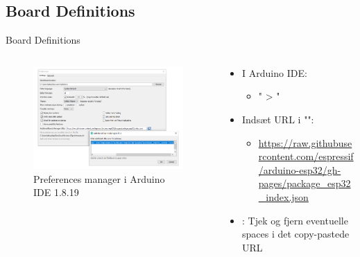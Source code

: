 \documentclass[aspectratio=169]{beamer}
\begin{document}
\subsection{Board Definitions}
\begin{frame}{Board Definitions}
\begin{columns}
	\begin{column}{0.5\textwidth}
		\begin{figure}
  			\includegraphics[width=\textwidth]{assets/pictures/boardsmanager.png}
  			\caption{Preferences manager i Arduino IDE 1.8.19}
  			\label{fig:boardsmanager}
		\end{figure}
	\end{column}
	\begin{column}{0.5\textwidth}
		\begin{textBox}
			\begin{itemize}
				\item I Arduino IDE:
				\begin{itemize}
					 \item " > "
				\end{itemize}
				\item Indsæt URL i "":
				\begin{itemize}
					 \item \tiny\url{https://raw.githubusercontent.com/espressif/arduino-esp32/gh-pages/package_esp32_index.json}
				\end{itemize}
				\item {}: Tjek og fjern eventuelle spaces i det copy-pastede URL
			\end{itemize}
		\end{textBox}
	\end{column}
\end{columns}
\end{frame}
\end{document}
